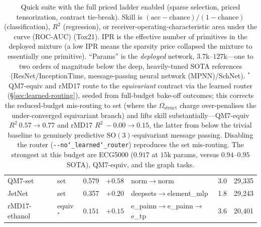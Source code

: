 \documentclass[11pt]{article}
\newcommand{\allowbreakhere}{\discretionary{}{}{}}
\newcommand{\code}[1]{\texttt{\def\_{\char`_\allowbreakhere}#1}}
\begin{document}
\begin{table}[h]
\begin{tabular}{p{2.6cm} p{1.7cm} p{1.1cm} p{0.9cm} p{2.6cm} p{0.7cm} p{1.1cm}}
QM7-set       & set        & 0.579 & $+0.58$ & norm$\to$\allowbreak norm                & 3.0 & 29{,}335\\
JetNet        & set        & 0.357 & $+0.20$ & deepsets$\to$\allowbreak element\_mlp    & 1.8 & 29{,}243\\
rMD17-ethanol & equiv$^\ast$ & $0.151$ & $+0.15$ & e\_painn$\to$\allowbreak e\_painn$\to$\allowbreak e\_tp & 3.6 & 20{,}401\\
\bottomrule
\end{tabular}
\caption{Quick suite with the full priced ladder enabled (sparse selection, priced tensorization,
contract tie-break). Skill is $(\text{acc}-\text{chance})/(1-\text{chance})$ (classification), $R^2$
(regression), or receiver-operating-characteristic area under the curve (ROC-AUC) (Tox21). IPR is the effective number of primitives in the deployed mixture
(a low IPR means the sparsity price collapsed the mixture to essentially one primitive). ``Params'' is
the \emph{deployed} network, $3.7$k--$127$k---one to two orders of magnitude below the deep,
heavily-tuned SOTA references (ResNet/InceptionTime, message-passing neural network (MPNN)/SchNet). $^\ast$QM7-equiv and rMD17 route to
the \emph{equivariant} contract via the learned router (\S\ref{sec:learned-routing}), seeded from
full-budget bake-off outcomes; this corrects the reduced-budget mis-routing to set (where the
$\Omega_{\mathrm{struct}}$ charge over-penalises the under-converged equivariant branch) and lifts skill
substantially---QM7-equiv $R^2\ 0.57\to0.77$ and rMD17 $R^2\ -0.00\to0.15$, the latter from below the
trivial baseline to genuinely predictive $\mathrm{SO}(3)$-equivariant message passing. Disabling the
router (\code{-{}-no\_learned\_router}) reproduces the set mis-routing. The strongest at this budget are
ECG5000 ($0.917$ at $15$k params, versus $0.94$--$0.95$ SOTA), QM7-equiv, and the graph tasks.}
\label{tab:quickval}
\end{table}
\end{document}
